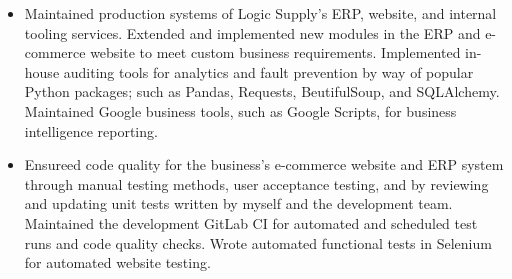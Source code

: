 \documentclass[10pt,a4paper]{altacv}
\begin{document}

\begin{fullwidth}
\makecvheader
\end{fullwidth}


\begin{itemize}
\item Maintained production systems of Logic Supply's ERP, website, and internal tooling
services. Extended and implemented new modules in the ERP and e-commerce website to meet custom business requirements.
Implemented in-house auditing tools for analytics and fault prevention by way of popular Python packages; such as Pandas, Requests, BeutifulSoup, and SQLAlchemy.
Maintained Google business tools, such as Google Scripts, for business intelligence reporting.
\end{itemize}

\divider

\begin{itemize}
\item Ensureed code quality for the business’s e-commerce website and ERP system through
manual testing methods, user acceptance testing, and by reviewing and
updating unit tests written by myself and the development team. Maintained the development GitLab CI for automated and scheduled test runs and code quality checks. Wrote automated functional tests in Selenium for automated website testing.
\end{itemize}
\end{document}
